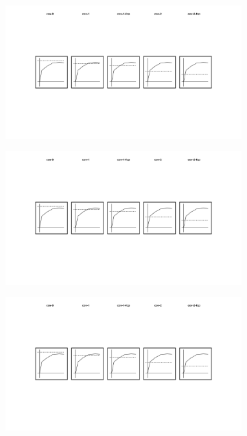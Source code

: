 \todo

\begin{figure}
  \centering
  \begin{subfigure}{0.19\textwidth}
    \centering
    \includegraphics[width=\textwidth]{img/cov-0}
  \end{subfigure}
  \begin{subfigure}{0.19\textwidth}
    \centering
    \includegraphics[width=\textwidth]{img/cov-1}
  \end{subfigure}
  \begin{subfigure}{0.19\textwidth}
    \centering
    \includegraphics[width=\textwidth]{img/cov-1-fcp}

\end{subfigure}
\end{figure}
